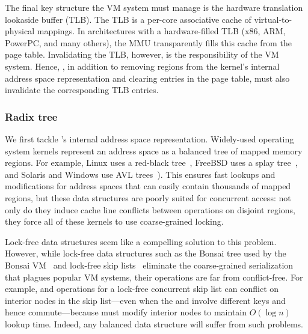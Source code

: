 The final key structure the VM system must manage is the hardware
translation lookaside buffer (TLB).  The TLB is a per-core associative
cache of virtual-to-physical mappings.  In architectures with a
hardware-filled TLB (x86, ARM, PowerPC, and many others), the MMU
transparently fills this cache from the page table.  Invalidating the
TLB, however, is the responsibility of the VM system.  Hence,
, in addition to removing regions from the kernel's
internal address space representation and clearing entries in the page
table, must also invalidate the corresponding TLB entries.


\subsubsection{Radix tree}
\label{sec:radixvm:tree}


We first tackle \vm's internal address space representation.
%
Widely-used operating system kernels represent an address space as a
balanced tree of mapped memory regions.  For example, Linux uses a
red-black tree~\cite{linux-source}, FreeBSD uses a splay
tree~\cite{freebsd-source}, and Solaris and Windows use AVL
trees~\cite{windows:wrk,windows:slides}).  This ensures fast lookups
and modifications for address spaces that can easily contain thousands
of mapped regions, but these data structures are poorly suited for
concurrent access: not only do they induce cache line conflicts
between operations on disjoint regions, they force all of these
kernels to use coarse-grained locking.

Lock-free data structures seem like a compelling solution to this
problem.  However, while lock-free data structures such as the Bonsai
tree used by the Bonsai VM~\cite{clements:bonsai} and lock-free skip
lists~\cite{herlihy:art} eliminate the coarse-grained serialization
that plagues popular VM systems, their operations are far from
conflict-free.  For example,  and 
operations for a lock-free concurrent skip list can conflict on
interior nodes in the skip list---even when the  and
 involve different keys and hence commute---because
 must modify interior nodes to maintain $O(\log n)$
lookup time.  Indeed, any balanced data structure will suffer from
such problems.

